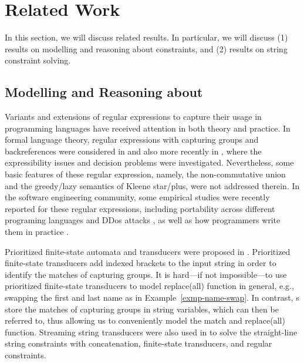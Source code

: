 \section{Related Work}
\label{sec-related}

In this section, we will discuss related results. In particular, we will discuss
(1) results on modelling and reasoning about
\regexp{} constraints, and (2) results on string constraint solving.


\subsection{Modelling and Reasoning about \regexp{}}

Variants and extensions of regular expressions to capture their usage in programming languages have received attention %
in both theory and practice. In formal language theory, regular expressions with capturing groups and backreferences were considered in \cite{CSY03,CN09} and also more recently in \cite{Freydenberger13,Schmid16,BM17b,FS19}, where the expressibility issues and decision problems were investigated. Nevertheless, some basic features of these regular expression, namely, the non-commutative union and the greedy/lazy semantics of Kleene star/plus, were not addressed therein. In the software engineering community, %
some empirical studies were recently reported for these regular expressions, including portability across different programing languages \cite{DMC+19} and DDos attacks \cite{SP18}, as well as how programmers write them in practice \cite{MDD+19}.


Prioritized finite-state automata and %
transducers were proposed in \cite{BM17}. Prioritized finite-state transducers add indexed brackets to the input string in order to identify the matches of capturing groups. It is hard---if not impossible---to use prioritized finite-state transducers to model replace(all) function in general, e.g., swapping the first and last name as in Example~\ref{exmp-name-swap}. In contrast, {\PSST}s store the matches of capturing groups in string variables, which can then be referred to, thus allowing us to conveniently model the match and replace(all) function. 
%
Streaming string transducers were also used in \cite{ZAM19} to solve the straight-line string constraints with concatenation, finite-state transducers, and regular constraints.

